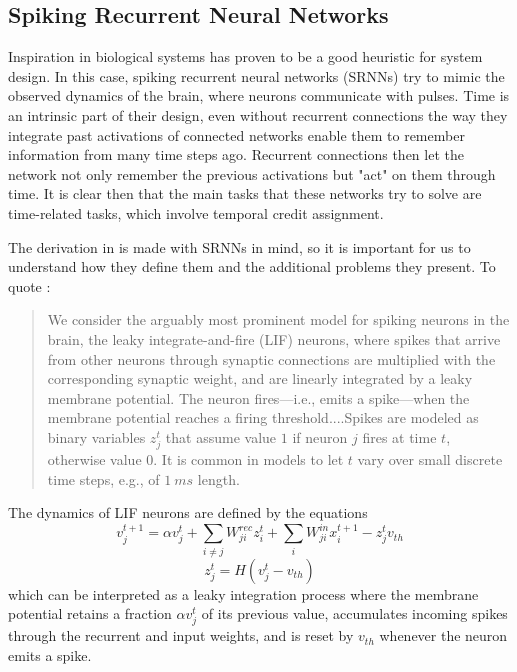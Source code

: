 \subsection{Spiking Recurrent Neural Networks}

Inspiration in biological systems has proven to be a good heuristic for system design. In this case, spiking recurrent neural networks (SRNNs) try to mimic the observed dynamics of the brain, where neurons communicate with pulses. Time is an intrinsic part of their design, even without recurrent connections the way they integrate past activations of connected networks enable them to remember information from many time steps ago. Recurrent connections then let the network not only remember the previous activations but "act" on them through time. It is clear then that the main tasks that these networks try to solve are time-related tasks, which involve temporal credit assignment.

The derivation in \cite{eprop2020} is made with SRNNs in mind, so it is important for us to understand how they define them and the additional problems they present. To quote \cite{eprop2020}:
\begin{quote}
We consider the arguably most prominent model for spiking neurons in the brain, the leaky integrate-and-fire (LIF) neurons, where spikes that arrive from other neurons through synaptic connections are multiplied with the corresponding synaptic weight, and are linearly integrated by a leaky membrane potential. The neuron fires—i.e., emits a spike—when the membrane potential reaches a firing threshold....Spikes are modeled as binary variables  $z^t_j$ that assume value $1$ if neuron $j$ fires at time $t$, otherwise value $0$. It is common in models to let $t$ vary over small discrete time steps, e.g., of $1\ ms$ length.  
\end{quote}
The dynamics of LIF neurons are defined by the equations
\begin{equation}
v^{t+1}_j = \alpha v^t_j + \sum_{i \neq j} W^{rec}_{ji} z^t_i + \sum_i W^{in}_{ji} x^{t+1}_i - z^t_jv_{th}
\end{equation}
\begin{equation}
z^t_j=H(v^t_j-v_{th})
\end{equation}
which can be interpreted as a leaky integration process where the membrane potential
retains a fraction $\alpha v^t_j$ of its previous value, accumulates incoming spikes
through the recurrent and input weights, and is reset by $v_{th}$ whenever the neuron emits a spike.

